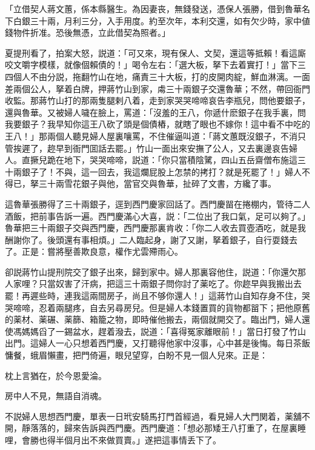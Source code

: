 \begin{myquote}[\markfont]
「立借契人蔣文蕙，係本縣醫生。為因妻丧，無錢發送，憑保人張勝，借到魯華名下白銀三十兩，月利三分，入手用度。約至次年，本利交還，如有欠少時，家中値錢物件折准。恐後無憑，立此借契為照者。」
\end{myquote}

夏提刑看了，拍案大怒，説道：「可又來，現有保人、文契，還這等抵賴！看這廝咬文嚼字模樣，就像個賴債的！」喝令左右：「選大板，拏下去着實打！」當下三四個人不由分説，拖翻竹山在地，痛責三十大板，打的皮開肉綻，鮮血淋漓。一面差兩個公人，拏着白牌，押蔣竹山到家，䖏三十兩銀子交還魯華；不然，帶回衙門收監。那蔣竹山打的那兩隻腿剌八着，走到家哭哭啼啼哀告李瓶兒，問他要銀子，還與魯華。又被婦人噦在臉上，罵道：「沒羞的王八，你遞什麽銀子在我手裏，問我要銀子？我早知你這王八砍了頭是個債樁，就瞎了眼也不嫁你！這中看不中吃的王八！」那兩個人聽見婦人屋裏嚷罵，不住催逼叫道：「蔣文蕙既沒銀子，不消只管挨遲了，趂早到衙門囬話去罷。」竹山一面出來安撫了公人，又去裏邊哀告婦人。直撅兒跪在地下，哭哭啼啼，説道：「你只當積陰騭，四山五岳齋僧布施這三十兩銀子了！不與，這一回去，我這爛屁股上怎禁的拷打？就是死罷了！」婦人不得已，拏三十兩雪花銀子與他，當官交與魯華，扯碎了文書，方纔了事。

這魯華張勝得了三十兩銀子，逕到西門慶家回話了。西門慶㽞在捲棚内，管待二人酒飯，把前事告訴一遍。西門慶滿心大喜，説：「二位出了我口氣，足可以夠了。」魯華把三十兩銀子交與西門慶，西門慶那裏肯收：「你二人收去買壺酒吃，就是我酬謝你了。後頭還有事相煩。」二人臨起身，謝了又謝，拏着銀子，自行耍錢去了。正是：嘗將壓善欺良意，權作尤雲殢雨心。

卻説蔣竹山提刑院交了銀子出來，歸到家中。婦人那裏容他住，説道：「你還欠那人家哩？只當奴害了汗病，把這三十兩銀子問你討了薬吃了。你趂早與我搬出去罷！再遲些時，連我這兩間房子，尚且不够你還人！」這蔣竹山自知存身不住，哭哭啼啼，忍着兩腿疼，自去另尋房兒。但是婦人本錢置買的貨物都㽞下；把他原舊的薬材、薬碾、薬篩、箱籠之物，即時催他搬去，兩個就開交了。臨出門，婦人還使馮媽媽舀了一錫盆水，趕着潑去，説道：「喜得冤家離眼前！」當日打發了竹山出門。這婦人一心只想着西門慶，又打聽得他家中沒事，心中甚是後悔。每日茶飯慵餐，蛾眉懶畫，把門倚遍，眼兒望穿，白盼不見一個人兒來。正是：

\begin{myquote}
枕上言猶在，於今恩愛淪。

房中人不見，無語自消魂。
\end{myquote}

不説婦人思想西門慶，單表一日玳安騎馬打門首經過，看見婦人大門関着，薬舖不開，靜落落的，歸來告訴與西門慶。西門慶道：「想必那矮王八打重了，在屋裏睡哩，會勝也得半個月出不來做買賣。」遂把這事情丢下了。

